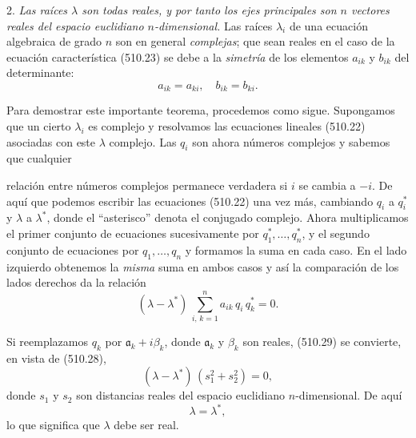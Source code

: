 \documentclass[12pt,a4paper]{book}
\begin{document}
2. \textit{Las raíces $\lambda$ son todas reales, y por tanto los ejes principales son $n$ vectores reales del espacio euclidiano $n$-dimensional.} Las raíces $\lambda_i$ de una ecuación algebraica de grado $n$ son en general \textit{complejas}; que sean reales en el caso de la ecuación característica (510.23) se debe a la \textit{simetría} de los elementos $a_{ik}$ y $b_{ik}$ del determinante:
\begin{equation}
a_{ik} = a_{ki}, \quad b_{ik} = b_{ki}. \tag{510.28}
\end{equation}

Para demostrar este importante teorema, procedemos como sigue. Supongamos que un cierto $\lambda_i$ es complejo y resolvamos las ecuaciones lineales (510.22) asociadas con este $\lambda$ complejo. Las $q_i$ son ahora números complejos y sabemos que cualquier


relación entre números complejos permanece verdadera si $i$ se cambia a $-i$. De aquí que podemos escribir las ecuaciones (510.22) una vez más, cambiando $q_i$ a $q_i^*$ y $\lambda$ a $\lambda^*$, donde el ``asterisco'' denota el conjugado complejo. Ahora multiplicamos el primer conjunto de ecuaciones sucesivamente por $q_1^*, \ldots, q_n^*$, y el segundo conjunto de ecuaciones por $q_1, \ldots, q_n$ y formamos la suma en cada caso. En el lado izquierdo obtenemos la \textit{misma} suma en ambos casos y así la comparación de los lados derechos da la relación
\begin{equation}
(\lambda - \lambda^*)\,\sum_{i,\,k=1}^{n} a_{ik}\,q_i\,q_k^* = 0. \tag{510.29}
\end{equation}

Si reemplazamos $q_k$ por $\mathfrak{a}_k + i\beta_k$, donde $\mathfrak{a}_k$ y $\beta_k$ son reales, (510.29) se convierte, en vista de (510.28),
\begin{equation}
(\lambda - \lambda^*)\,(s_1^2 + s_2^2) = 0, \tag{510.30}
\end{equation}
donde $s_1$ y $s_2$ son distancias reales del espacio euclidiano $n$-dimensional. De aquí
\begin{equation}
\lambda = \lambda^*, \tag{510.31}
\end{equation}
lo que significa que $\lambda$ debe ser real.
\end{document}
